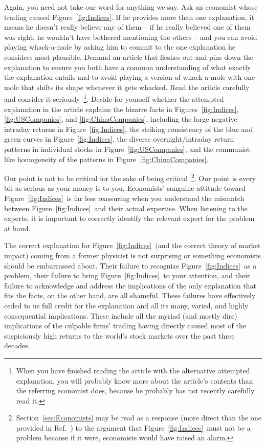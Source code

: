 \documentclass[twocolumn,twoside,prd,floatfix,letterpaper]{revtex4}
\def \FigMain {Figure~\ref{fig:Indices}}
\def \FigUSCompanies {Figure~\ref{fig:USCompanies}}
\def \FigChinaCompanies {Figure~\ref{fig:ChinaCompanies}}
\def \FigsWorldUSChina {Figures~\ref{fig:Indices}, \ref{fig:USCompanies}, and \ref{fig:ChinaCompanies}}
\begin{document}
Again, you need not take our word for anything we say.  Ask an economist whose trading caused \FigMain.  If he provides more than one explanation, it means he doesn't really believe any of them -- if he really believed one of them was right, he wouldn't have bothered mentioning the others -- and you can avoid playing whack-a-mole by asking him to commit to the one explanation he considers most plausible.  Demand an article that fleshes out and pins down the explanation to ensure you both have a common understanding of what exactly the explanation entails and to avoid playing a version of whack-a-mole with one mole that shifts its shape whenever it gets whacked.  Read the article carefully and consider it seriously~\footnote{When you have finished reading the article with the alternative attempted explanation, you will probably know more about the article's contents than the referring economist does, because he probably has not recently carefully read it.}.  Decide for yourself whether the attempted explanation in the article explains the bizarre facts in \FigsWorldUSChina, including the large negative intraday returns in \FigMain, the striking consistency of the blue and green curves in \FigMain, the diverse overnight/intraday return patterns in individual stocks in \FigUSCompanies, and the communist-like homogeneity of the patterns in \FigChinaCompanies.

Our point is not to be critical for the sake of being critical~\footnote{Section~\ref{sec:Economists} may be read as a response (more direct than the one provided in Ref.~\cite{knuteson2021}) to the argument that \FigMain\ must not be a problem because if it were, economists would have raised an alarm.}.  Our point is every bit as serious as your money is to you.   Economists' sanguine attitude toward \FigMain\ is far less reassuring when you understand the mismatch between \FigMain\ and their actual expertise.  When listening to the experts, it is important to correctly identify the relevant expert for the problem at hand.

The correct explanation for \FigMain\ (and the correct theory of market impact) coming from a former physicist is not surprising or something economists should be embarrassed about.  Their failure to recognize \FigMain\ as a problem, their failure to bring \FigMain\ to your attention, and their failure to acknowledge and address the implications of the only explanation that fits the facts, on the other hand, are all shameful.  These failures have effectively ceded to us full credit for the explanation and all its many, varied, and highly consequential implications.  These include all the myriad (and mostly dire) implications of the culpable firms' trading having directly caused most of the suspiciously high returns to the world's stock markets over the past three decades.
\end{document}
